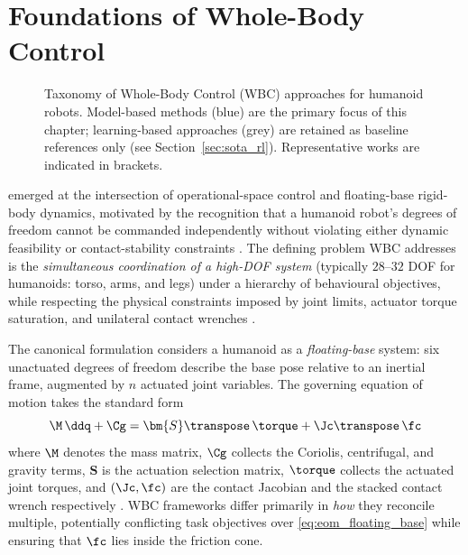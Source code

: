 \section{Foundations of Whole-Body Control}
\label{sec:sota_foundations}

\begin{figure}[htbp]
  \centering
  \resizebox{\textwidth}{!}{}
  \caption{Taxonomy of Whole-Body Control (WBC) approaches for humanoid robots.
           Model-based methods (blue) are the primary focus of this chapter;
           learning-based approaches (grey) are retained as baseline references only
           (see Section~\ref{sec:sota_rl}).
           Representative works are indicated in brackets.}
  \label{fig:wbc_taxonomy}
\end{figure}

\WBC{} emerged at the intersection of operational-space control
\cite{Khatib1987} and floating-base rigid-body dynamics, motivated by the
recognition that a humanoid robot's degrees of freedom cannot be
commanded independently without violating either dynamic feasibility or
contact-stability constraints \cite{Sentis2005}. The defining problem WBC
addresses is the \emph{simultaneous coordination of a high-DOF system}
(typically $28$--$32$ DOF for humanoids: torso, arms, and legs) under a
hierarchy of behavioural objectives, while respecting the physical
constraints imposed by joint limits, actuator torque saturation, and
unilateral contact wrenches \cite{Sentis2005,Wensing2013}.

The canonical formulation considers a humanoid as a \emph{floating-base}
system: six unactuated degrees of freedom describe the base pose relative
to an inertial frame, augmented by $n$ actuated joint variables. The
governing equation of motion takes the standard form
\begin{equation}
  \M\,\ddq + \Cg = \bm{S}\transpose\,\torque + \Jc\transpose\,\fc
  \label{eq:eom_floating_base}
\end{equation}
where $\M$ denotes the mass matrix, $\Cg$ collects the Coriolis,
centrifugal, and gravity terms, $\bm{S}$ is the actuation selection
matrix, $\torque$ collects the actuated joint torques, and
$(\Jc,\fc)$ are the contact Jacobian and the stacked contact wrench
respectively \cite{Sentis2005,Wensing2013,Koolen2016}. WBC frameworks
differ primarily in \emph{how} they reconcile multiple, potentially
conflicting task objectives over \eqref{eq:eom_floating_base} while
ensuring that $\fc$ lies inside the friction cone.

